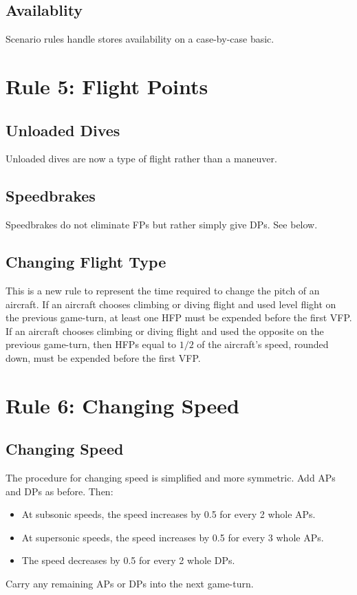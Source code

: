 \documentclass[10pt]{extarticle}
\begin{document}
\subsection{Availablity} Scenario rules handle stores availability on a case-by-case basic.

\section{Rule 5: Flight Points}

\subsection{Unloaded Dives} Unloaded dives are now a type of flight rather than a maneuver.

\subsection{Speedbrakes} Speedbrakes do not eliminate FPs but rather simply give DPs. See below.

\subsection{Changing Flight Type} This is a new rule to represent the time required to change the pitch of an aircraft. If an aircraft chooses climbing or diving flight and used level flight on the previous game-turn, at least one HFP must be expended before the first VFP. If an aircraft chooses climbing or diving flight and used the opposite on the previous game-turn, then HFPs equal to $1/2$ of the aircraft's speed, rounded down, must be expended before the first VFP. 

\section{Rule 6: Changing Speed}

\subsection{Changing Speed} The procedure for changing speed is simplified and more symmetric. Add APs and DPs as before. Then: 
\begin{itemize}
    \item At subsonic speeds, the speed increases by 0.5 for every 2 whole APs. 
    \item At supersonic speeds, the speed increases by 0.5 for every 3 whole APs. 
    \item The speed decreases by 0.5 for every 2 whole DPs.
\end{itemize}
Carry any remaining APs or DPs into the next game-turn. 
\end{document}
